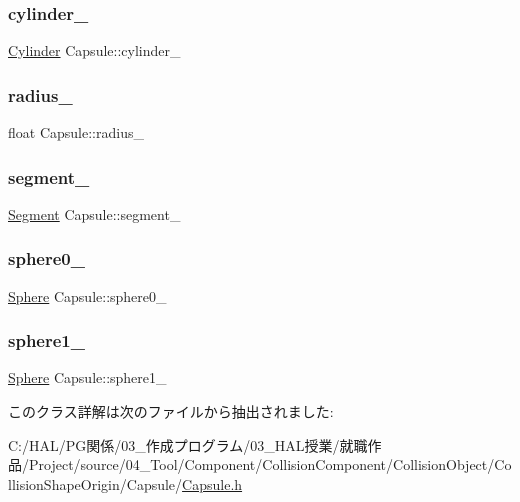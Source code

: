 \subsubsection{\texorpdfstring{cylinder\+\_\+}{cylinder\_}}
{\footnotesize\ttfamily \mbox{\hyperlink{class_cylinder}{Cylinder}} Capsule\+::cylinder\+\_\+}

\mbox{\label{class_capsule_a5a479b152df710dba41b6529cf11199c}} 
\subsubsection{\texorpdfstring{radius\+\_\+}{radius\_}}
{\footnotesize\ttfamily float Capsule\+::radius\+\_\+}

\mbox{\label{class_capsule_a9557489d45b8a343f58d815965be988c}} 
\subsubsection{\texorpdfstring{segment\+\_\+}{segment\_}}
{\footnotesize\ttfamily \mbox{\hyperlink{class_segment}{Segment}} Capsule\+::segment\+\_\+}

\mbox{\label{class_capsule_a37c7db7fe8cb06be2f374d7aba24267e}} 
\subsubsection{\texorpdfstring{sphere0\+\_\+}{sphere0\_}}
{\footnotesize\ttfamily \mbox{\hyperlink{class_sphere}{Sphere}} Capsule\+::sphere0\+\_\+}

\mbox{\label{class_capsule_ac478efc95993a85908a7cd2759133ab2}} 
\subsubsection{\texorpdfstring{sphere1\+\_\+}{sphere1\_}}
{\footnotesize\ttfamily \mbox{\hyperlink{class_sphere}{Sphere}} Capsule\+::sphere1\+\_\+}



このクラス詳解は次のファイルから抽出されました\+:\begin{DoxyCompactItemize}
\item 
C\+:/\+H\+A\+L/\+P\+G関係/03\+\_\+作成プログラム/03\+\_\+\+H\+A\+L授業/就職作品/\+Project/source/04\+\_\+\+Tool/\+Component/\+Collision\+Component/\+Collision\+Object/\+Collision\+Shape\+Origin/\+Capsule/\mbox{\hyperlink{_capsule_8h}{Capsule.\+h}}\end{DoxyCompactItemize}
